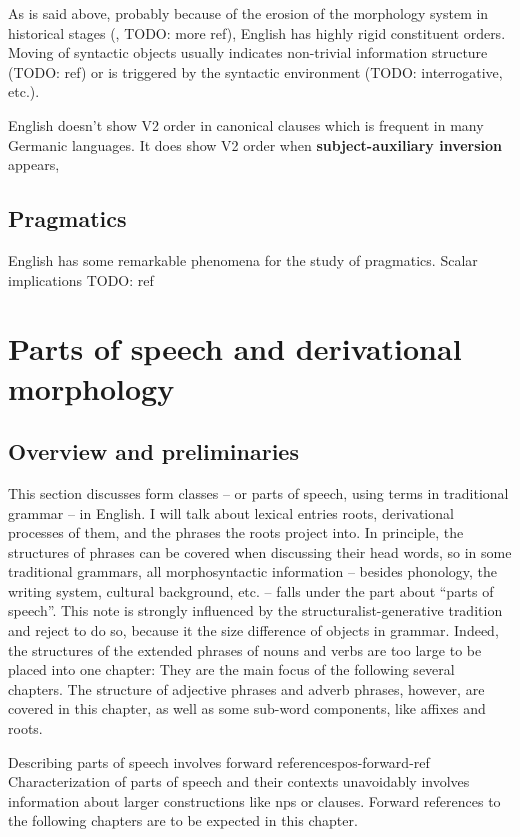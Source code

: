 \documentclass[UTF8, a4paper, oneside, scheme=plain]{ctexrep}
\newcommand*{\concept}[1]{\textbf{#1}}
\begin{document}
As is said above, probably because of the erosion of the morphology system in historical stages
(, TODO: more ref),
English has highly rigid constituent orders. 
Moving of syntactic objects usually indicates 
non-trivial information structure (TODO: ref) 
or is triggered by the syntactic environment (TODO: interrogative, etc.).

English doesn't show V2 order in canonical clauses which is frequent in many Germanic languages.
It does show V2 order when \concept{subject-auxiliary inversion} appears,

\section{Pragmatics}

English has some remarkable phenomena for the study of pragmatics.
Scalar implications TODO: ref

\chapter{Parts of speech and derivational morphology}\label{chap:pos}

\section{Overview and preliminaries}\label{sec:nouns.overview}

This section discusses form classes -- or parts of speech, using terms in traditional grammar -- in English.
I will talk about lexical entries roots, derivational processes of them,  
and the phrases the roots project into.
In principle, the structures of phrases can be covered when discussing their head words,
so in some traditional grammars,
all morphosyntactic information -- besides phonology, the writing system, cultural background, etc. -- 
falls under the part about ``parts of speech''.
This note is strongly influenced by the structuralist-generative tradition
and reject to do so, 
because it the size difference of objects in grammar.
Indeed, the structures of the extended phrases of nouns and verbs are too large 
to be placed into one chapter:
They are the main focus of the following several chapters.
The structure of adjective phrases and adverb phrases, however, are covered in this chapter,
as well as some sub-word components, like affixes and roots.

\begin{learnbox}{Describing parts of speech involves forward references}{pos-forward-ref}
    Characterization of parts of speech and their contexts unavoidably involves 
    information about larger constructions like \acs{np}s or clauses.
    Forward references to the following chapters are to be expected in this chapter.
\end{learnbox}
\end{document}
